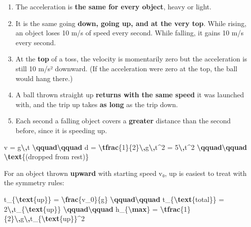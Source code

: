 \documentclass[
]{article}
\newenvironment{Shaded}{\begin{snugshade}}{\end{snugshade}}
\newcommand{\FunctionTok}[1]{\textcolor[rgb]{0.13,0.29,0.53}{\textbf{#1}}}
\newcommand{\NormalTok}[1]{#1}
\providecommand{\tightlist}{%
  \setlength{\itemsep}{0pt}\setlength{\parskip}{0pt}}
\begin{document}
\begin{enumerate}
\def\labelenumi{\arabic{enumi}.}
\tightlist
\item
  The acceleration is \textbf{the same for every object}, heavy or
  light.
\item
  It is the same going \textbf{down, going up, and at the very top}.
  While rising, an object loses 10 m/s of speed every second. While
  falling, it gains 10 m/s every second.
\item
  At the \textbf{top} of a toss, the velocity is momentarily zero but
  the acceleration is still 10 m/s² downward. (If the acceleration were
  zero at the top, the ball would hang there.)
\item
  A ball thrown straight up \textbf{returns with the same speed} it was
  launched with, and the trip up takes \textbf{as long} as the trip
  down.
\item
  Each second a falling object covers a \textbf{greater} distance than
  the second before, since it is speeding up.
\end{enumerate}

\begin{Shaded}
\begin{Highlighting}[]
\NormalTok{v = g}\FunctionTok{\textbackslash{},}\NormalTok{t }\FunctionTok{\textbackslash{}qquad\textbackslash{}qquad}\NormalTok{ d = }\FunctionTok{\textbackslash{}tfrac}\NormalTok{\{1\}\{2\}}\FunctionTok{\textbackslash{},}\NormalTok{g}\FunctionTok{\textbackslash{},}\NormalTok{t\^{}2 = 5}\FunctionTok{\textbackslash{},}\NormalTok{t\^{}2 }\FunctionTok{\textbackslash{}qquad\textbackslash{}qquad} \FunctionTok{\textbackslash{}text}\NormalTok{\{(dropped from rest)\}}
\end{Highlighting}
\end{Shaded}

For an object thrown \textbf{upward} with starting speed v₀, up is
easiest to treat with the symmetry rules:

\begin{Shaded}
\begin{Highlighting}[]
\NormalTok{t\_\{}\FunctionTok{\textbackslash{}text}\NormalTok{\{up\}\} = }\FunctionTok{\textbackslash{}frac}\NormalTok{\{v\_0\}\{g\} }\FunctionTok{\textbackslash{}qquad\textbackslash{}qquad}\NormalTok{ t\_\{}\FunctionTok{\textbackslash{}text}\NormalTok{\{total\}\} = 2}\FunctionTok{\textbackslash{},}\NormalTok{t\_\{}\FunctionTok{\textbackslash{}text}\NormalTok{\{up\}\} }\FunctionTok{\textbackslash{}qquad\textbackslash{}qquad}\NormalTok{ h\_\{}\FunctionTok{\textbackslash{}max}\NormalTok{\} = }\FunctionTok{\textbackslash{}tfrac}\NormalTok{\{1\}\{2\}}\FunctionTok{\textbackslash{},}\NormalTok{g}\FunctionTok{\textbackslash{},}\NormalTok{t\_\{}\FunctionTok{\textbackslash{}text}\NormalTok{\{up\}\}\^{}2}
\end{Highlighting}
\end{Shaded}
\end{document}

